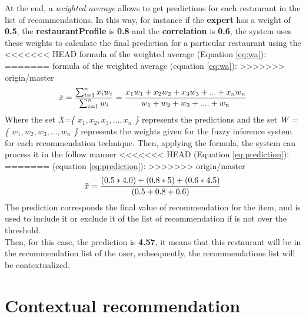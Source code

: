 At the end, a \textit{weighted average} allows to get predictions for
each restaurant in the list of recommendations. In this way, for
instance if the \textbf{expert} has a weight of \textbf{0.5}, the
\textbf{restaurantProfile} is \textbf{0.8} and the
\textbf{correlation} is \textbf{0.6}, the system uses these weights to
calculate the final prediction for a particular restaurant using the
<<<<<<< HEAD
formula of the weighted average (Equation  \ref{eq:wa}):
=======
formula of the weighted average (equation \ref{eq:wa}):
>>>>>>> origin/master
\begin{equation}\label{eq:wa}
\displaystyle \bar{x} = {\sum_{i=1}^{n} x_{i} w_{i}
\over \sum_{i=1}^{n} w_{i} } = 
{x_{1}w_{1} + x_{2}w_{2} + x_{3}w_{3} + ... + x_{n}w_{n} 
\over w_{1} + w_{2} + w_{3} + .... + w_{n}}
\end{equation}
Where the set \textit{X=\{ $x_{1}, x_{2}, x_{3},...,x_{n}$ \}} represents the 
predictions and the set \textit{W = \{ $w_{1}, w_{2}, w_{3},...,w_{n}$ \} } 
represents the weights 
given for the fuzzy inference system for each recommendation technique. 
Then, applying the formula, the system can process it in the follow manner  
<<<<<<< HEAD
(Equation  \ref{eq:prediction}):
=======
(equation \ref{eq:prediction}):
>>>>>>> origin/master
\begin{equation}\label{eq:prediction}
\displaystyle \bar{x}  = {(0.5 * 4.0) + ( 0.8 * 5) + (0.6 * 4.5)
\over (0.5 + 0.8 + 0.6)}
\end{equation}
The prediction corresponds the final value of recommendation for the
item, and is used to include it or exclude it of the list of
recommendation if is not over the threshold. \\ Then, for this case, the
prediction is \textbf{4.57}, it means that this restaurant will be in the
recommendation list of the user, subsequently, the recommendations
list will be contextualized.

\section{Contextual recommendation} 

